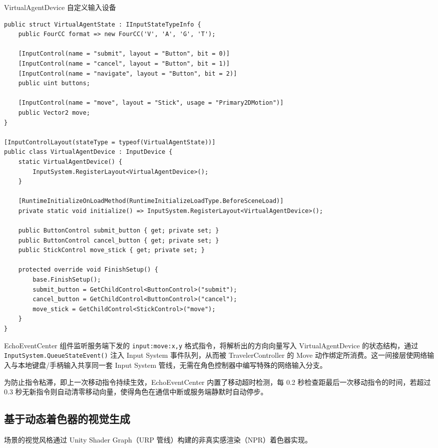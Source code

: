 \documentclass[bachelor]{njupthesis}
\begin{document}
\begin{code}
\caption{VirtualAgentDevice 自定义输入设备}
\label{code:virtual-agent-device}
\lstset{style=codeblock}
\begin{lstlisting}
public struct VirtualAgentState : IInputStateTypeInfo {
    public FourCC format => new FourCC('V', 'A', 'G', 'T');

    [InputControl(name = "submit", layout = "Button", bit = 0)]
    [InputControl(name = "cancel", layout = "Button", bit = 1)]
    [InputControl(name = "navigate", layout = "Button", bit = 2)]
    public uint buttons;

    [InputControl(name = "move", layout = "Stick", usage = "Primary2DMotion")]
    public Vector2 move;
}

[InputControlLayout(stateType = typeof(VirtualAgentState))]
public class VirtualAgentDevice : InputDevice {
    static VirtualAgentDevice() {
        InputSystem.RegisterLayout<VirtualAgentDevice>();
    }

    [RuntimeInitializeOnLoadMethod(RuntimeInitializeLoadType.BeforeSceneLoad)]
    private static void initialize() => InputSystem.RegisterLayout<VirtualAgentDevice>();

    public ButtonControl submit_button { get; private set; }
    public ButtonControl cancel_button { get; private set; }
    public StickControl move_stick { get; private set; }

    protected override void FinishSetup() {
        base.FinishSetup();
        submit_button = GetChildControl<ButtonControl>("submit");
        cancel_button = GetChildControl<ButtonControl>("cancel");
        move_stick = GetChildControl<StickControl>("move");
    }
}
\end{lstlisting}
\end{code}

EchoEventCenter 组件监听服务端下发的 \texttt{input:move:x,y} 格式指令，将解析出的方向向量写入 VirtualAgentDevice 的状态结构，通过 \texttt{InputSystem.QueueStateEvent()} 注入 Input System 事件队列，从而被 TravelerController 的 Move 动作绑定所消费。这一间接层使网络输入与本地键盘/手柄输入共享同一套 Input System 管线，无需在角色控制器中编写特殊的网络输入分支。

为防止指令粘滞，即上一次移动指令持续生效，EchoEventCenter 内置了移动超时检测，每 0.2 秒检查距最后一次移动指令的时间，若超过 0.3 秒无新指令则自动清零移动向量，使得角色在通信中断或服务端静默时自动停步。

\subsection{基于动态着色器的视觉生成}
\label{sec:ghost-mountain}
场景的视觉风格通过 Unity Shader Graph（URP 管线）构建的非真实感渲染（NPR）着色器实现。
\end{document}

